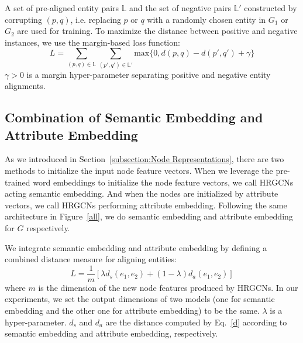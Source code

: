 	A set of pre-aligned entity pairs $\mathbb{L}$ and the set of negative pairs $\mathbb{L'}$  constructed by corrupting $(p, q)$, i.e. replacing $p$ or $q$ with a randomly chosen entity in $G_1$ or $G_2$ are used for training. To maximize the distance between positive and negative instances, we use the margin-based loss function:
	\begin{equation}
	\label{d}
	L=\sum\limits_{(p,q)\in \mathbb{L}}\sum\limits_{(p',q')\in \mathbb{L'}}\mathrm{max}\{0,d(p,q)-d(p',q')+\gamma\}
	\end{equation}
	$\gamma > 0$ is a margin hyper-parameter separating positive and negative entity alignments.
	
	\subsection{Combination of Semantic Embedding and Attribute Embedding}
	As we introduced in Section~\ref{subsection:Node Representations}, there are two methods to initialize the input node feature vectors. 
	When we leverage the pre-trained word embeddings to initialize the node feature vectors, we call HRGCNs acting semantic embedding. 
	And when the nodes are initialized by attribute vectors, we call HRGCNs performing attribute embedding. 
	Following the same architecture in Figure~\ref{all}, we do semantic embedding and attribute embedding for $G$ respectively.
	
	We integrate semantic embedding and attribute embedding by defining a combined distance measure for aligning entities:
	\begin{equation}
		L=\frac{1}{m}[\lambda d_s(e_1,e_2)+(1-\lambda)d_a(e_1,e_2)]
	\end{equation}
	where $m$ is the dimension of the new node features produced by HRGCNs. 
	In our experiments, we set the output dimensions of two models (one for semantic embedding and the other one for attribute embedding) to be the same. 
	$\lambda$ is a hyper-parameter. $d_s$ and $d_a$ are the distance computed by Eq.~\ref{d} according to semantic embedding and attribute embedding, respectively.
	
